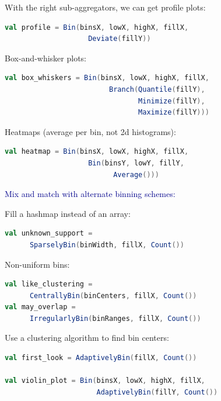 \documentclass{beamer}
\begin{document}
\begin{frame}[fragile]{}
With the right sub-aggregators, we can get profile plots:
\begin{lstlisting}[language=scala]
val profile = Bin(binsX, lowX, highX, fillX,
                    Deviate(fillY))
\end{lstlisting}

Box-and-whisker plots:
\begin{lstlisting}[language=scala]
val box_whiskers = Bin(binsX, lowX, highX, fillX,
                         Branch(Quantile(fillY),
                                Minimize(fillY),
                                Maximize(fillY)))
\end{lstlisting}

Heatmaps (average per bin, not 2d histograms):
\begin{lstlisting}[language=scala]
val heatmap = Bin(binsX, lowX, highX, fillX,
                    Bin(binsY, lowY, fillY,
                          Average()))
\end{lstlisting}
\end{frame}

\begin{frame}[fragile]{}
\textcolor{darkblue}{\large Mix and match with alternate binning schemes:}

\vspace{0.5 cm}
Fill a hashmap instead of an array:
\begin{lstlisting}[language=scala]
val unknown_support =
      SparselyBin(binWidth, fillX, Count())
\end{lstlisting}

Non-uniform bins:
\begin{lstlisting}[language=scala]
val like_clustering =
      CentrallyBin(binCenters, fillX, Count())
val may_overlap =
      IrregularlyBin(binRanges, fillX, Count())
\end{lstlisting}

Use a clustering algorithm to find bin centers:
\begin{lstlisting}[language=scala]
val first_look = AdaptivelyBin(fillX, Count())

val violin_plot = Bin(binsX, lowX, highX, fillX,
                      AdaptivelyBin(fillY, Count())
\end{lstlisting}
\end{frame}
\end{document}
